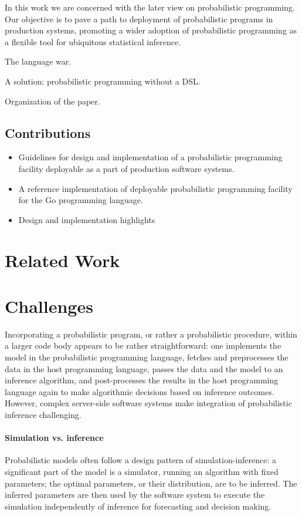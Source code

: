 \documentclass[sigplan,review,10pt,anonymous]{acmart}
\begin{document}
\begin{sloppypar}
	In this work we are concerned with the later view on
	probabilistic programming. Our objective is to pave a path to
	deployment of probabilistic programs in production systems,
	promoting a wider adoption of probabilistic programming as a
	flexible tool for ubiquitous statistical inference. 



The language war. 

A solution: probabilistic programming without a DSL.

Organization of the paper.

\subsection*{Contributions}

\begin{itemize}
	\item Guidelines for design and implementation of a
		probabilistic programming facility deployable as a part 
		of production software systems.
	\item A reference implementation of deployable probabilistic
		programming facility for the Go programming language.
	\item Design and implementation highlights 
\end{itemize}

\section{Related Work}

\section{Challenges}

Incorporating a probabilistic program, or rather a probabilistic
procedure, within a larger code body appears to be rather
straightforward: one implements the model in the probabilistic
programming language, fetches and preprocesses the data in the
host programming language, passes the data and the model to an
inference algorithm, and post-processes the results in the
host programming language again to make algorithmic
decisions based on inference outcomes. However, complex
server-side software systems make integration of probabilistic
inference challenging. 

\paragraph{Simulation vs. inference} Probabilistic models
often follow a design pattern of simulation-inference: a
significant part of the model is a simulator, running an
algorithm with fixed parameters; the optimal parameters, or
their distribution, are to be inferred. The inferred parameters
are then used by the software system to execute the simulation
independently of inference for forecasting and decision making.


\end{sloppypar}
\end{document}
